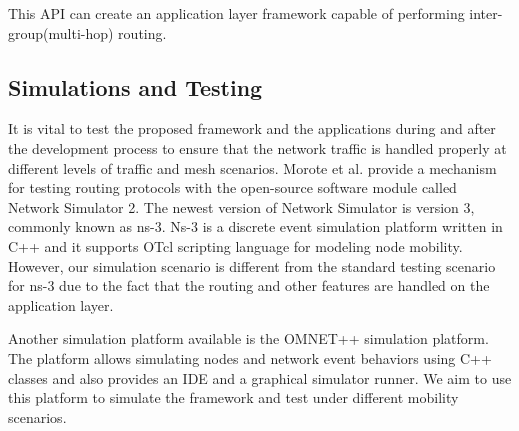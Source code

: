 \vspace{0.1cm}

This API can create an application layer framework capable of performing
inter-group(multi-hop) routing.

\subsection{Simulations and Testing}

It is vital to test the proposed framework and the applications during and
after the development process to ensure that the network traffic is handled
properly at different levels of traffic and mesh scenarios. Morote et al.
provide a mechanism for testing routing protocols with the open-source software
module called Network Simulator 2\cite{morote2010}. The newest version of
Network Simulator is version 3, commonly known as ns-3\cite{ns3}. Ns-3 is a
discrete event simulation platform written in C++ and it supports OTcl scripting
language for modeling node mobility\cite{morote2010}. However, our simulation
scenario is different from the standard testing scenario for ns-3 due to the
fact that the routing and other features are handled on the application layer.

Another simulation platform available is the OMNET++ simulation platform. The
platform allows simulating nodes and network event behaviors using C++ classes
and also provides an IDE and a graphical simulator runner\cite{opensim}. We aim to
use this platform to simulate the framework and test under different mobility
scenarios.
